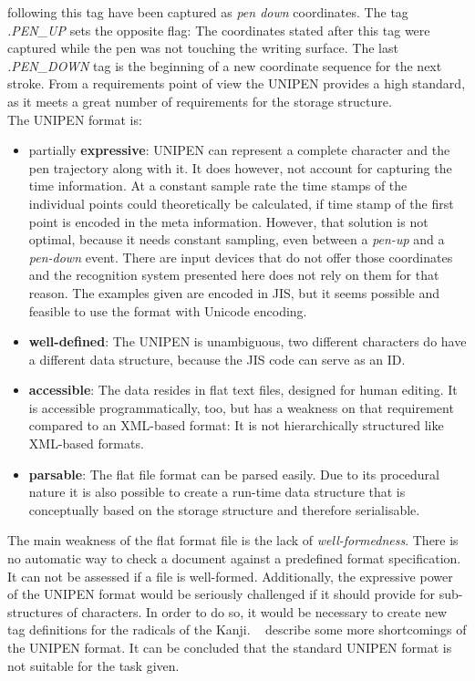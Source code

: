 following this tag have been captured as \emph{pen down} coordinates.
The tag \emph{.PEN\_UP} sets the opposite flag: The coordinates stated after 
this tag were captured while the pen was not touching the writing surface.
The last \emph{.PEN\_DOWN} tag is the beginning of a new coordinate sequence
for the next stroke. From a requirements point of view the UNIPEN provides a
high standard, as it meets a great number of requirements for the storage 
structure. \\
The UNIPEN format is:
\begin{itemize}
  \item partially \textbf{expressive}: UNIPEN can represent a complete character
        and the pen trajectory along with it. It does however, not account for
        capturing the time information. At a constant sample rate the time stamps
        of the individual points could theoretically be calculated, 
        if time stamp of the first point is encoded in the meta information. 
        However, that solution is not optimal, because it needs constant
        sampling, even between a \emph{pen-up} and a \emph{pen-down} event.
        There are input devices that do not offer those coordinates and the 
        recognition system presented here does not rely on them for that reason.
        The examples given are encoded in JIS, but it seems possible and feasible
        to use the format with Unicode encoding.

  \item \textbf{well-defined}: The UNIPEN is unambiguous, two different 
        characters do have a different data structure, because the JIS code 
        can serve as an ID.

  \item \textbf{accessible}: The data resides in flat text files, designed for 
        human editing. It is accessible programmatically, too, but has a weakness
        on that requirement compared to an XML-based format: It is not 
        hierarchically structured like XML-based formats.

  \item \textbf{parsable}: The flat file format can be parsed easily. Due to its
        procedural nature it is also possible to create a run-time data structure
        that is conceptually based on the storage structure and therefore
        serialisable.
\end{itemize}
The main weakness of the flat format file is the lack of \emph{well-formedness}.
There is no automatic way to check a document against a predefined format 
specification. It can not be assessed if a file is well-formed.
Additionally, the expressive power of the UNIPEN format would be seriously 
challenged if it should provide for sub-structures of characters.
In order to do so, it would be necessary to create new tag definitions for the 
radicals of the Kanji. ~\citeyear{Agrawal2005} 
describe some more shortcomings of the UNIPEN format. It can be concluded that 
the standard UNIPEN format is not suitable for the task given. 


